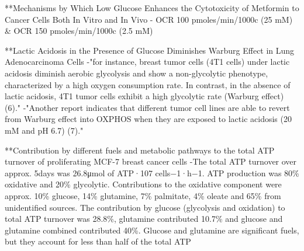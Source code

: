 \documentclass[11pt,a4paper]{article}
\begin{document}
**Mechanisms by Which Low Glucose Enhances the Cytotoxicity of Metformin to Cancer Cells Both In Vitro and In Vivo
- OCR 100 pmoles/min/1000c (25 mM) \&  OCR 150 pmoles/min/1000c (2.5 mM)


**Lactic Acidosis in the Presence of Glucose Diminishes Warburg Effect in Lung Adenocarcinoma Cells
-"for instance, breast tumor cells (4T1 cells) under lactic acidosis diminish aerobic glycolysis and show a non-glycolytic phenotype, characterized by a high oxygen consumption rate. In contrast, in the absence of lactic acidosis, 4T1 tumor cells exhibit a high glycolytic rate (Warburg effect) (6)."
-"Another report indicates that different tumor cell lines are able to revert from Warburg effect into OXPHOS when they are exposed to lactic acidosis (20 mM and pH 6.7) (7)."

**Contribution by different fuels and metabolic pathways to the total ATP turnover of proliferating MCF-7 breast cancer cells 
-The total ATP turnover over approx. 5days was 26.8μmol of ATP·107 cells−1·h−1. ATP production was 80\% oxidative and 20\% glycolytic. Contributions to the oxidative component were approx. 10\% glucose, 14\% glutamine, 7\% palmitate, 4\% oleate and 65\% from unidentified sources. The contribution by glucose (glycolysis and oxidation) to total ATP turnover was 28.8\%, glutamine contributed 10.7\% and glucose and glutamine combined contributed 40\%. Glucose and glutamine are significant fuels, but they account for less than half of the total ATP 
\end{document}
